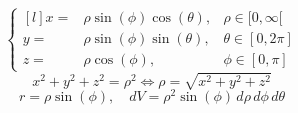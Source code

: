 \begin{equation*}
    \left\{
    \begin{matrix*}[l]
        x = & \rho\sin(\phi)\cos(\theta), & \rho \in [0,\infty[\\
        y = & \rho\sin(\phi)\sin(\theta), & \theta \in [0,2\pi]\\
        z = & \rho\cos(\phi), & \phi \in [0,\pi]
    \end{matrix*}
    \right.
\end{equation*}
\[ x^2+y^2+z^2=\rho^2 \Longleftrightarrow \rho =\sqrt{x^2+y^2+z^2}\]
\[ r= \rho\sin(\phi), \quad dV = \rho^2\sin(\phi)\,d\rho\,d\phi\,d\theta\]